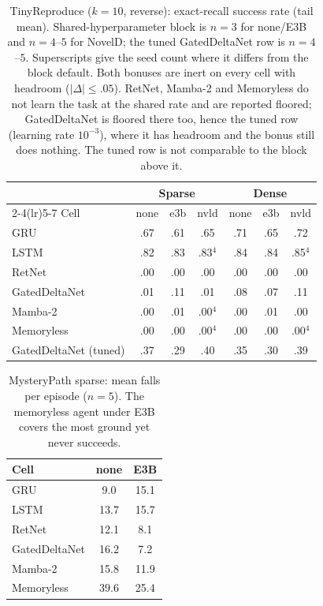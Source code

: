 \begin{table}[t]\centering
\caption{TinyReproduce ($k{=}10$, reverse): exact-recall success rate (tail mean). Shared-hyperparameter block is $n{=}3$ for none/E3B and $n{=}4$--$5$ for NovelD; the tuned GatedDeltaNet row is $n{=}4$--$5$. Superscripts give the seed count where it differs from the block default. Both bonuses are inert on every cell with headroom ($|\Delta|{\le}.05$). RetNet, Mamba-2 and Memoryless do not learn the task at the shared rate and are reported floored; GatedDeltaNet is floored there too, hence the tuned row (learning rate $10^{-3}$), where it has headroom and the bonus still does nothing. The tuned row is not comparable to the block above it.}
\label{tab:tiny}\small\setlength{\tabcolsep}{5pt}
\begin{tabular}{@{}l ccc ccc@{}}\toprule
 & \multicolumn{3}{c}{Sparse} & \multicolumn{3}{c}{Dense} \\
\cmidrule(lr){2-4}\cmidrule(lr){5-7}
Cell & none & e3b & nvld & none & e3b & nvld \\\midrule
GRU & .67 & .61 & .65 & .71 & .65 & .72 \\
LSTM & .82 & .83 & .83$^{4}$ & .84 & .84 & .85$^{4}$ \\
RetNet & .00 & .00 & .00 & .00 & .00 & .00 \\
GatedDeltaNet & .01 & .11 & .01 & .08 & .07 & .11 \\
Mamba-2 & .00 & .01 & .00$^{4}$ & .00 & .01 & .00 \\
Memoryless & .00 & .00 & .00$^{4}$ & .00 & .00 & .00$^{4}$ \\
\midrule
GatedDeltaNet (tuned) & .37 & .29 & .40 & .35 & .30 & .39 \\
\bottomrule\end{tabular}\end{table}

\begin{table}[t]\centering
\caption{MysteryPath sparse: mean falls per episode ($n{=}5$). The memoryless agent under E3B covers the most ground yet never succeeds.}
\label{tab:falls}\small\begin{tabular}{@{}lcc@{}}\toprule
Cell & none & E3B \\\midrule
GRU & 9.0 & 15.1 \\
LSTM & 13.7 & 15.7 \\
RetNet & 12.1 & 8.1 \\
GatedDeltaNet & 16.2 & 7.2 \\
Mamba-2 & 15.8 & 11.9 \\
Memoryless & 39.6 & 25.4 \\
\bottomrule\end{tabular}\end{table}
